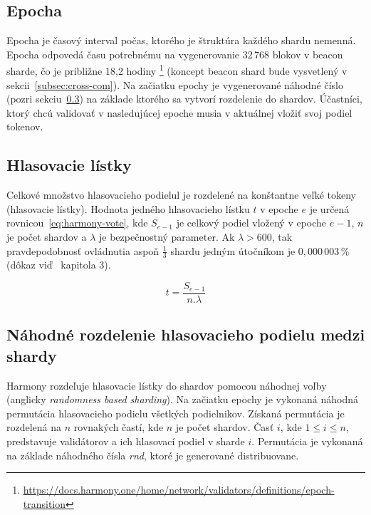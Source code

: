 \subsection{Epocha}\label{subsec:epoch}
Epocha je časový interval počas, ktorého je štruktúra každého shardu nemenná. Epocha odpovedá času potrebnému na vygenerovanie 32\,768 blokov v beacon sharde, čo je približne 18,2 hodiny%
\footnote{\url{https://docs.harmony.one/home/network/validators/definitions/epoch-transition}} (koncept beacon shard bude vysvetlený v sekcii~\ref{subsec:cross-com}). Na začiatku epochy je vygenerované náhodné číslo (pozri sekciu~\ref{subsec:rnd}) na základe ktorého sa vytvorí rozdelenie do shardov. Účastníci, ktorý chcú validovať v nasledujúcej epoche musia v aktuálnej vložiť svoj podiel tokenov.


\subsection{Hlasovacie lístky}
Celkové množstvo hlasovacieho podielul je rozdelené na konštantne veľké tokeny (hlasovacie lístky). Hodnota jedného hlasovacieho lístku $t$ v epoche $e$ je určená rovnicou~\ref{eq:harmony-vote}, kde $S_{e-1}$ je celkový podiel vložený v epoche $e-1$, $n$ je počet shardov a $\lambda$ je bezpečnostný parameter. Ak $\lambda > 600$, tak pravdepodobnosť ovládnutia aspoň $\frac{1}{3}$ shardu jedným útočníkom je $0,000\,003$\,\% (dôkaz viď~\cite{harmonyDoc} kapitola 3).

\begin{equation}\label{eq:harmony-vote}
	t = \frac{S_{e-1}}{n . \lambda}
\end{equation}

\subsection{Náhodné rozdelenie hlasovacieho podielu medzi shardy}\label{subsec:rnd}
Harmony rozdeľuje hlasovacie lístky do shardov pomocou náhodnej voľby (anglicky \textit{randomness based sharding}). Na začiatku epochy je vykonaná náhodná permutácia hlasovacieho podielu všetkých podielnikov. Získaná permutácia je rozdelená na $n$ rovnakých častí, kde $n$ je počet shardov. Časť $i$, kde $1 \leq i \leq n$, predstavuje validátorov a ich hlasovací podiel v sharde $i$. Permutácia je vykonaná na základe náhodného čísla \textit{rnd}, ktoré je generované distribuovane.

